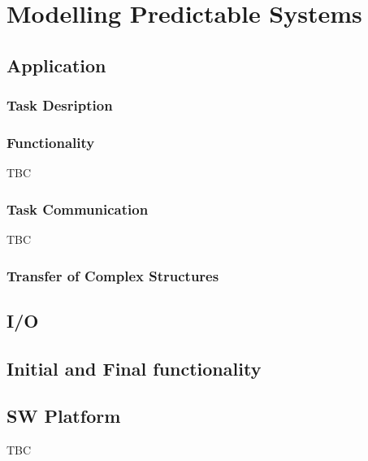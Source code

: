 \documentclass{article}
\begin{document}


\section{Modelling Predictable Systems}
\label{sec:mod_pred}

\subsection{Application}
\label{sec:application}



\subsubsection{Task Desription}
\label{sec:task_description}



\subsubsection{Functionality}
\label{sec:func}
TBC

\subsubsection{Task Communication}
\label{sec:app_comm}
TBC

\subsubsection{Transfer of Complex Structures}
\label{sec:app_complex_structures}



\subsection{I/O}
\label{sec:io}

\subsection{Initial and Final functionality}
\label{sec:app_initialization}



\subsection{SW Platform}
\label{sec:sw_platform}
TBC
\end{document}
